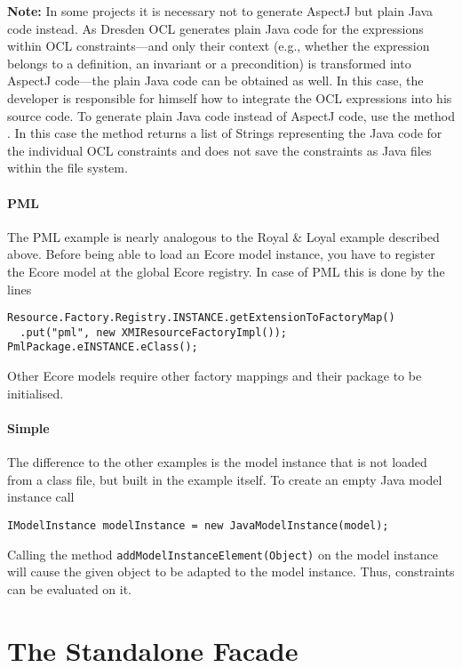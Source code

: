 \textbf{Note:} In some projects it is necessary not to generate AspectJ but
plain Java code instead. As Dresden OCL generates plain Java code for the
expressions within OCL constraints---and only their context (e.g., whether the
expression belongs to a definition, an invariant or a precondition) is
transformed into AspectJ code---the plain Java code can be obtained as well. In
this case, the developer is responsible for himself how to integrate the OCL
expressions into his source code. To generate plain Java code instead of
AspectJ code, use the method
. In this case the method returns a list of Strings
representing the Java code for the individual OCL constraints and does not save
the constraints as Java files within the file system.

\paragraph{PML}
The PML example is nearly analogous to the Royal \& Loyal example described 
above. Before being able to load an Ecore model instance, you have to register 
the Ecore model at the global Ecore registry. In case of PML this is done by 
the lines
\lstset{language=Java}
\begin{lstlisting}
Resource.Factory.Registry.INSTANCE.getExtensionToFactoryMap()
  .put("pml", new XMIResourceFactoryImpl());
PmlPackage.eINSTANCE.eClass();
\end{lstlisting}
Other Ecore models require other factory mappings and their package to be 
initialised.

\paragraph{Simple}
The difference to the other examples is the model instance that is not  loaded
from a class file, but built in the example itself. To create an empty Java 
model instance call
\lstset{language=Java}
\begin{lstlisting}
IModelInstance modelInstance = new JavaModelInstance(model);
\end{lstlisting}
Calling the method \lstinline[breaklines=true]{addModelInstanceElement(Object)} 
on the model instance will cause the given object to be adapted to the model 
instance. Thus, constraints can be evaluated on it.



\section{The Standalone Facade}

